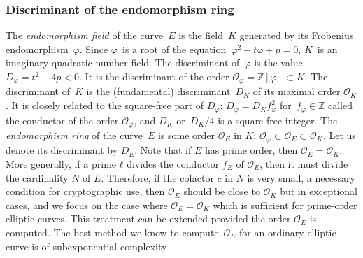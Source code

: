 \documentclass[twocolumn,letterpaper,10pt]{article}
\let\ro\mathcal
\begin{document}
\subsubsection{Discriminant of the endomorphism ring}
\label{sss:discriminant}



The \emph{endomorphism field} of the curve~$E$
is the field~$K$ generated by its Frobenius endomorphism~$φ$.
Since $φ$~is a root of the equation~$φ^2 - t φ + p = 0$,
$K$~is an imaginary quadratic number field.
The discriminant of~$φ$ is the value~$D_φ = t^2 - 4 p < 0$.
It is the discriminant of the order $\ro O_φ = ℤ[φ] \subset K$.
The discriminant of~$K$ is the (fundamental) discriminant~$D_K$ of its
maximal order $\ro O_K$.
It is closely related to the square-free part of $D_φ$:
$D_φ = D_K f_φ^2$ for~$f_φ ∈ ℤ$
called the conductor of the order $\ro O_φ$,
and $D_K$ or~$D_K/4$ is a square-free integer.
The \emph{endomorphism ring} of the curve~$E$ is some order $\ro O_E$ in $K$:
$\ro O_φ \subset \ro O_E \subset \ro O_K$.
Let us denote its discriminant by $D_E$.
Note that if $E$ has prime order, then $\ro O_E = \ro O_K$.
More generally, if a prime $ℓ$ divides the conductor $f_E$ of $\ro O_E$,
then it must divide the cardinality $N$ of $E$.
Therefore, if the cofactor $c$ in $N$ is very small, a necessary condition for
cryptographic use, then $\ro O_E$ should be close to $\ro O_K$ but
in exceptional cases, and we focus on the case where $\ro O_E = \ro O_K$
which is sufficient for prime-order elliptic curves.
This treatment can be extended provided the order $\ro O_E$ is computed.
The best method we know to compute~$\ro O_E$ for an ordinary elliptic curve
is of subexponential complexity~\cite{jmc2012bisson}.
\end{document}
